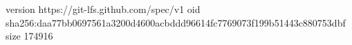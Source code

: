 version https://git-lfs.github.com/spec/v1
oid sha256:daa77bb0697561a3200d4600acbddd96614fc7769073f199b51443c880753dbf
size 174916
